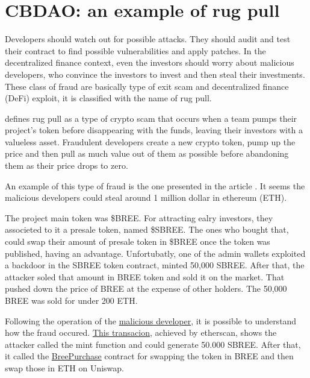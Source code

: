 \section{CBDAO: an example of rug pull}
\label{sec:Exploits:CBDAO}
Developers should watch out for possible attacks. They should audit and test their contract to find possible vulnerabilities and apply patches.
In the decentralized finance context, even the investors should worry about malicious developers, who convince the investors to invest and then steal their investments.
These class of fraud are basically  type of exit scam and decentralized finance (DeFi) exploit, it is classified with the name of rug pull.


\citet{RugPullDef} defines rug pull as a  type of crypto scam that occurs when a team pumps their project's token before disappearing with the funds, 
leaving their investors with a valueless asset. 
Fraudulent developers create a new crypto token, 
pump up the price and then pull as much value out of them as possible before abandoning them as their price drops to zero.

An example of this type of fraud is the one presented in the article \citet{CBDAO}.
It seems the malicious developers could steal around 1 million dollar in ethereum (ETH). 

The project main token was \$BREE. For attracting ealry investors, they associeted to it a presale token, named \$SBREE. 
The ones who bought that, could swap their amount of presale token in \$BREE once the token was published, having an advantage.
Unfortubatly, one of the admin wallets exploited a backdoor in the SBREE token contract, minted 50,000 SBREE. After that, the attacker soled that amount in BREE token and sold it on the market.
That pushed down the price of BREE at the expense of other holders. The 50,000 BREE was sold for under 200 ETH.

Following the operation of the \href{https://etherscan.io/address/0x85c90f369676789d3234ecf07adb5262df1bcf15#tokentxns}{malicious developer}, it is possible to understand how the fraud occured.
\href{https://etherscan.io/tx/0x3bf7b06d6737e6d222234acc58dea634c7ff75e6cc447bece6cc264f2e1db9d2}{This transacion}, achieved by etherscan, shows the attacker called the mint function and could generate 
50.000 SBREE. After that, it called the \href{https://etherscan.io/address/0x60c3094a586b02cb416ec4df31119d4513ff0dde#code}{BreePurchase} 
contract for swapping the token in BREE and then swap those in ETH on Uniswap.


